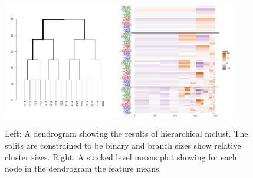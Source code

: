 \documentclass[simplex.tex]{subfiles}
\begin{document}
\begin{figure}[!h]
\begin{cframed}
\centering
\includegraphics[width=0.45\textwidth, clip = true, trim = 2cm 5cm 4cm 6cm ]{../../figs/K15_samp1e4_01e3_dendro.png}
\includegraphics[width=0.45\textwidth, clip = true, trim = 1cm 0 5mm 1mm]{../../figs/K15_samp1e4_01e3_slcmeans.png}
\caption{Left:  A dendrogram showing the results of hierarchical mclust.
The splits are constrained to be binary and branch sizes show relative
cluster sizes.  Right: A stacked level means plot showing for each node
in the dendrogram the feature means.}
\label{fig:meda}
\end{cframed}
\end{figure}

\clearpage

\end{document}
